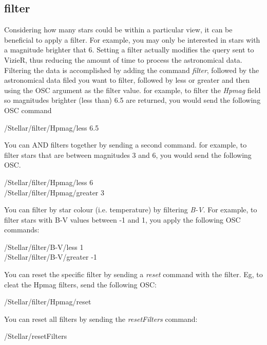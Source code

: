 \subsection{filter}   
Considering how many stars could be within a particular view, it can be beneficial to apply a filter.  For example, you may only be interested in stars with a magnitude brighter that 6. Setting a filter actually modifies the query sent to VizieR, thus reducing the amount of time to process the astronomical data.
Filtering the data is accomplished by adding the command \textit{filter}, followed by the astronomical data filed you want to filter, followed by less or greater and then using the OSC argument as the filter value.  for example, to filter the \textit{Hpmag} field so magnitudes brighter (less than) 6.5 are returned, you would send the following OSC command
   
    \begin{syntax}	   
   	\medskip
   	/Stellar/filter/Hpmag/less 6.5
   	\medskip
   \end{syntax}  

You can AND filters together by sending a second command. for example, to filter stars that are between magnitudes 3 and 6, you would send the following OSC.
    \begin{syntax}	 
	\medskip
	/Stellar/filter/Hpmag/less 6\\
	/Stellar/filter/Hpmag/greater 3
	\medskip
\end{syntax}  

You can filter by star colour (i.e. temperature) by filtering \textit{B-V}. For example, to filter stars with  B-V values between -1 and 1, you apply the following OSC commands:  
     \begin{syntax}	   
 	\medskip
 	/Stellar/filter/B-V/less 1\\
 	/Stellar/filter/B-V/greater -1
 	\medskip
\end{syntax}  

You can reset the specific filter by sending a \textit{reset} command with the filter. Eg, to cleat the Hpmag filters, send the following OSC:  
    \begin{syntax}	
	\medskip
	/Stellar/filter/Hpmag/reset
	\medskip
\end{syntax}  


You can reset all filters by sending the \textit{resetFilters} command: 
\begin{syntax}	
	\medskip
	/Stellar/resetFilters
	\medskip
\end{syntax}  
